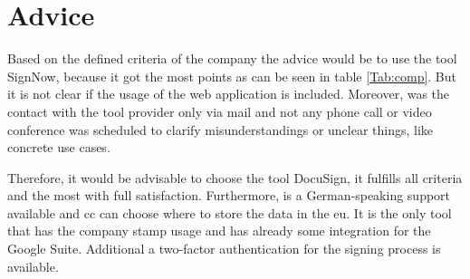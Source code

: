 \section{Advice}
Based on the defined criteria of the company the advice would be to use the tool SignNow, because it got the most points as can be seen in table \ref{Tab:comp}. But it is not clear if the usage of the web application is included. Moreover, was the contact with the tool provider only via mail and not any phone call or video conference was scheduled to clarify misunderstandings or unclear things, like concrete use cases. 

Therefore, it would be advisable to choose the tool DocuSign, it fulfills all criteria and the most with full satisfaction. Furthermore, is a German-speaking support available and \gls{cc} can choose where to store the data in the \gls{eu}. It is the only tool that has the company stamp usage and has already some integration for the Google Suite. Additional a two-factor authentication for the signing process is available. 